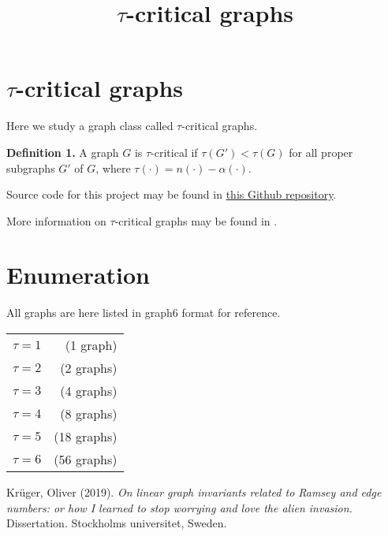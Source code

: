 \documentclass{article}
\title{$\tau$-critical graphs}
\begin{document}
\section{$\tau$-critical graphs}

Here we study a graph class called $\tau$-critical graphs.

{\bf Definition 1.} A graph $G$ is $\tau$-critical if $\tau(G') < \tau(G)$ for all proper subgraphs $G'$ of $G$, where $\tau(\cdot) = n(\cdot) - \alpha(\cdot)$.

Source code for this project may be found in \href{https://github.com/tbk1988/taucritical}{this Github repository}.

More information on $\tau$-critical graphs may be found in
\cite{thesis}.

\section{Enumeration}

All graphs are here listed in graph6 format for reference.

\begin{tabular}{lr}
  \href{../txt/taucrit_1.g6.txt}{$\tau = 1$} & (1 graph) \\
  \href{../txt/taucrit_2.g6.txt}{$\tau = 2$} & (2 graphs) \\
  \href{../txt/taucrit_3.g6.txt}{$\tau = 3$} & (4 graphs) \\
  \href{../txt/taucrit_4.g6.txt}{$\tau = 4$} & (8 graphs) \\
  \href{../txt/taucrit_5.g6.txt}{$\tau = 5$} & (18 graphs) \\
  \href{../txt/taucrit_6.g6.txt}{$\tau = 6$} & (56 graphs)
\end{tabular}

\begin{thebibliography}{9}
   Kr\"uger, Oliver (2019). \emph{On linear graph invariants related to Ramsey and edge numbers: or how I learned to stop worrying and love the alien invasion.} Dissertation. Stockholms universitet, Sweden.
\end{thebibliography}
\end{document}
